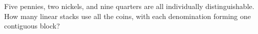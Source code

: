 Five pennies, two nickels, and nine quarters are all individually distinguishable. How many linear stacks use all the coins, with each denomination forming one contiguous block?
